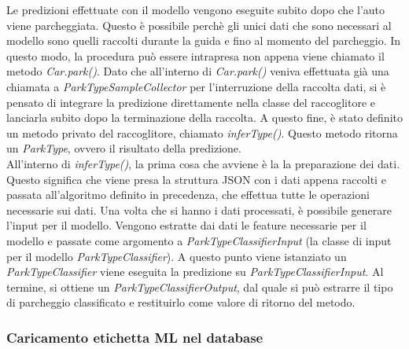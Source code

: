 Le predizioni effettuate con il modello vengono eseguite subito dopo che l'auto viene 
parcheggiata. Questo è possibile perchè gli unici dati che sono necessari al modello
sono quelli raccolti durante la guida e fino al momento del parcheggio. In questo modo,
la procedura può essere intrapresa non appena viene chiamato il metodo \emph{Car.park()}.
Dato che all'interno di \emph{Car.park()} veniva effettuata già una chiamata a 
\emph{ParkTypeSampleCollector} per l'interruzione della raccolta dati, si è pensato di 
integrare la predizione direttamente nella classe del raccoglitore e lanciarla subito
dopo la terminazione della raccolta. A questo fine, è stato definito un metodo privato
del raccoglitore, chiamato \emph{inferType()}. Questo metodo ritorna un \emph{ParkType},
ovvero il risultato della predizione.\\
All'interno di \emph{inferType()}, la prima cosa che avviene è la la preparazione dei 
dati. Questo significa che viene presa la struttura JSON con i dati appena raccolti e 
passata all'algoritmo definito in precedenza, che effettua tutte le operazioni necessarie
sui dati. Una volta che si hanno i dati processati, è possibile generare l'input per il 
modello. %
Vengono estratte dai dati le feature necessarie per il modello e passate come
argomento a \emph{ParkTypeClassifierInput} (la classe di input per il modello 
\emph{ParkTypeClassifier}). A questo punto viene istanziato un \emph{ParkTypeClassifier} 
viene eseguita la predizione su \emph{ParkTypeClassifierInput}. Al termine, si ottiene
un \emph{ParkTypeClassifierOutput}, dal quale si può estrarre il tipo di parcheggio 
classificato e restituirlo come valore di ritorno del metodo.


\subsubsection{Caricamento etichetta ML nel database}

